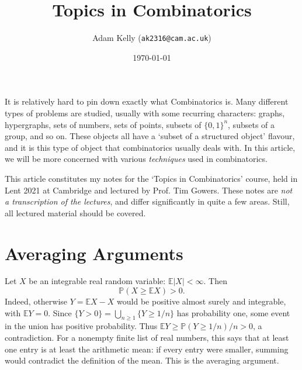 \documentclass[a4paper]{scrartcl}
\title{Topics in Combinatorics}
\author{Adam Kelly (\texttt{ak2316@cam.ac.uk})}
\date{\today}
\begin{document}
\maketitle

It is relatively hard to pin down exactly what Combinatorics is. Many different types of problems are studied, usually with some recurring characters: graphs, hypergraphs, sets of numbers, sets of points, subsets of $\{0, 1\}^n$, subsets of a group, and so on. These objects all have a `subset of a structured object' flavour, and it is this type of object that combinatorics usually deals with. In this article, we will be more concerned with various \emph{techniques} used in combinatorics.

This article constitutes my notes for the `Topics in Combinatorics' course, held in Lent 2021 at Cambridge and lectured by Prof. Tim Gowers. These notes are \emph{not a transcription of the lectures}, and differ significantly in quite a few areas. Still, all lectured material should be covered.


\tableofcontents





\section{Averaging Arguments}

Let $X$ be an integrable real random variable: $\mathbb E|X|<\infty$. Then
\[
\mathbb P(X\geq\mathbb E X)>0.
\]
Indeed, otherwise $Y=\mathbb E X-X$ would be positive almost surely and integrable, with $\mathbb E Y=0$. Since $\{Y>0\}=\bigcup_{n\geq1}\{Y\geq1/n\}$ has probability one, some event in the union has positive probability. Thus $\mathbb E Y\geq\mathbb P(Y\geq1/n)/n>0$, a contradiction.
For a nonempty finite list of real numbers, this says that at least one entry is at least the arithmetic mean: if every entry were smaller, summing would contradict the definition of the mean. This is the averaging argument.
\end{document}

